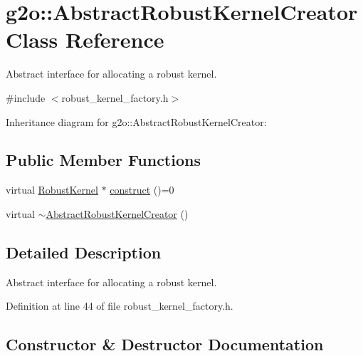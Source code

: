 \hypertarget{classg2o_1_1AbstractRobustKernelCreator}{}\section{g2o\+:\+:Abstract\+Robust\+Kernel\+Creator Class Reference}
\label{classg2o_1_1AbstractRobustKernelCreator}


Abstract interface for allocating a robust kernel.  




{\ttfamily \#include $<$robust\+\_\+kernel\+\_\+factory.\+h$>$}



Inheritance diagram for g2o\+:\+:Abstract\+Robust\+Kernel\+Creator\+:
\subsection*{Public Member Functions}
\begin{DoxyCompactItemize}
\item 
virtual \hyperlink{classg2o_1_1RobustKernel}{Robust\+Kernel} $\ast$ \hyperlink{classg2o_1_1AbstractRobustKernelCreator_a3022ab9279e52151d37f8cb4d1524d47}{construct} ()=0
\item 
virtual \hyperlink{classg2o_1_1AbstractRobustKernelCreator_af62964a80bc9f76d837df0913057f8f7}{$\sim$\+Abstract\+Robust\+Kernel\+Creator} ()
\end{DoxyCompactItemize}


\subsection{Detailed Description}
Abstract interface for allocating a robust kernel. 

Definition at line 44 of file robust\+\_\+kernel\+\_\+factory.\+h.



\subsection{Constructor \& Destructor Documentation}
